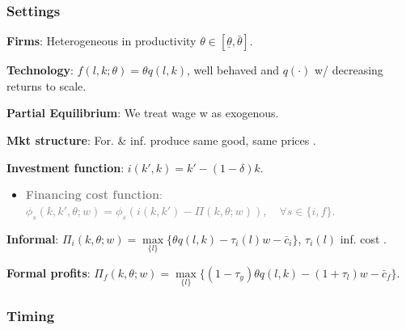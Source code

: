 \documentclass[aspectratio=169]{beamer}
\begin{document}
\begin{frame}
\frametitle{Settings}


\textbf{Firms}: Heterogeneous in productivity $\theta \in [\underline{\theta}, \bar{\theta}]$. 

\vspace{5mm}
\pause

\textbf{Technology}: $f(l,k; \theta) = \theta q(l,k)$, well behaved and $q(\cdot)$ w/ decreasing returns to scale. 

\vspace{5mm}
\pause

\textbf{Partial Equilibrium}: We treat wage w as exogenous.

\vspace{5mm}
\pause

\textbf{Mkt structure}: For. \& inf. produce same good, same prices \textcolor{lightgray}{\citep{imbert2023rural}}.


\vspace{5mm}
\pause
    
\textbf{Investment function}: $i(k',k) = k' - (1 - \delta) k$.

\begin{itemize}
    \item \textcolor{gray}{\textbf{Financing cost function}: $\phi_s(k,k',\theta;w) = \phi_s(i(k, k') - \Pi(k,\theta;w)), \quad \forall s \in \{i,f\}$.}
\end{itemize}

\vspace{5mm}
\pause


\textbf{Informal}: $\Pi_i(k,\theta;w) = \max \limits_{\{l\}} \{ \theta q(l,k) - \tau_i(l) w - \bar{c}_i \}$, $\tau_i(l)$ inf. cost \textcolor{lightgray}{\citep{ulyssea2018firms}}.

\vspace{5mm}
\pause

\textbf{Formal profits}: $\Pi_f(k,\theta;w) = \max \limits_{\{l\}} \{ (1 - \tau_y) \theta q(l,k) - (1 + \tau_l) w - \bar{c}_f \}$.

\end{frame}


\begin{frame}
\frametitle{Timing}

\begin{figure}[h!] 
    \begin{center}
        
    \end{center}
\end{figure}

\end{frame}
\end{document}
